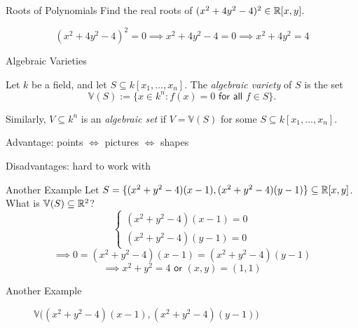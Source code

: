 \documentclass{beamer}
\newcommand{\V}{\mathbb V}
\begin{document}
\begin{frame}{Roots of Polynomials}
Find the real roots of $(x^2 + 4y^2 - 4)^2 \in \mathbb R[x,y]$. \pause

$$(x^2 + 4y^2 - 4)^2 = 0 \implies x^2 + 4y^2 - 4 = 0 \implies x^2 + 4y^2 = 4$$
\pause
\begin{center}
\end{center}
\end{frame}
\begin{frame}{Algebraic Varieties}
\begin{definition}
Let $k$ be a field, and let $S\subseteq k[x_1, \ldots, x_n]$. The \textit{algebraic variety} of $S$ is the set
$$\V(S) := \{x\in k^n: f(x) = 0 \textsf{ for all } f\in S\}.$$

Similarly, $V\subseteq k^n$ is an \textit{algebraic set} if $V = \V(S)$ for some $S\subseteq k[x_1,\ldots, x_n]$.
\end{definition}
\pause

Advantage: points $\iff$ pictures $\iff$ shapes

Disadvantages: hard to work with
\end{frame}
\begin{frame}{Another Example}
Let $S = \{(x^2+y^2-4)(x-1), (x^2+y^2-4)(y-1)\}\subseteq \mathbb R[x,y]$. What is $\V(S)\subseteq \R^2$? \pause
$$\begin{cases}
(x^2+y^2-4)(x-1) = 0 \\
(x^2+y^2-4)(y-1) = 0
\end{cases}$$\pause
$$\implies 0= (x^2+y^2-4)(x-1) = (x^2+y^2-4)(y-1)$$
$$\implies x^2+y^2 = 4 \textsf{ or } (x,y) = (1,1)$$
\end{frame}
\begin{frame}{Another Example}
\begin{figure}[h!]
    \centering
    \caption{$\V\Big((x^2+y^2-4)(x-1), (x^2+ y^2-4)(y-1)\Big)$}
    \label{myfigure}
\end{figure}
\end{frame}
\end{document}
